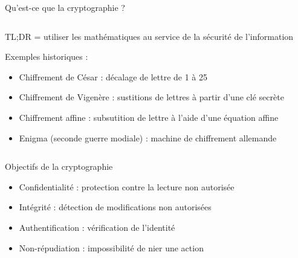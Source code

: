\begin{frame}{Qu'est-ce que la cryptographie ?}
  \begin{columns}
    \begin{column}{0.65\textwidth}
      TL;DR = utiliser les mathématiques au service de la sécurité de l'information

      Exemples historiques :
      \begin{itemize}
        \item Chiffrement de César : décalage de lettre de 1 à 25
        \item Chiffrement de Vigenère : sustitions de lettres à partir d'une clé secrète
        \item Chiffrement affine : subsutition de lettre à l'aide d'une équation affine
        \item Enigma (seconde guerre modiale) : machine de chiffrement allemande
      \end{itemize}
    \end{column}

    \begin{column}{0.3\textwidth}
      
    \end{column}
  \end{columns}
\end{frame}

\begin{frame}{Objectifs de la cryptographie}
  \begin{itemize}
    \item Confidentialité : protection contre la lecture non autorisée
    \item Intégrité : détection de modifications non autorisées
    \item Authentification : vérification de l'identité
    \item Non-répudiation : impossibilité de nier une action
  \end{itemize}
\end{frame}






